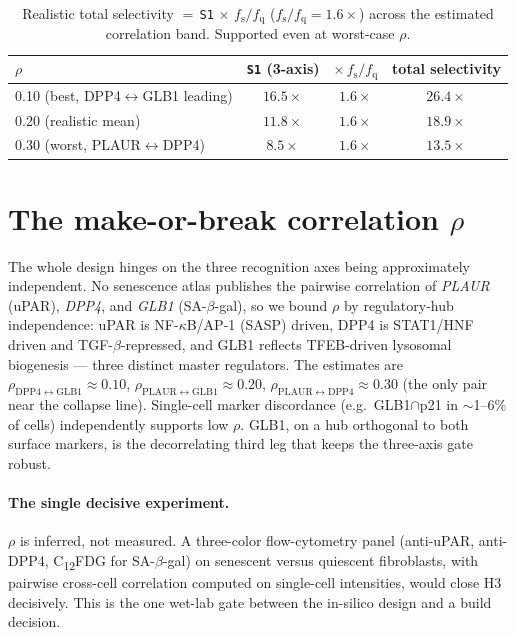 \documentclass[11pt,a4paper]{article}
\newcommand{\fs}{f_{\mathrm{s}}}
\newcommand{\fq}{f_{\mathrm{q}}}
\begin{document}
\begin{table}[h]
\centering
\caption{Realistic total selectivity $=\,$\texttt{S1}$\,\times\,\fs/\fq$
($\fs/\fq=1.6\times$) across the estimated correlation band. Supported even at
worst-case $\rho$.}
\label{tab:total}
\small
\begin{tabular}{@{}lccc@{}}
\toprule
$\rho$ & \texttt{S1} (3-axis) & $\times\,\fs/\fq$ & total selectivity \\
\midrule
0.10 (best, DPP4$\leftrightarrow$GLB1 leading) & $16.5\times$ & $1.6\times$ & $\mathbf{26.4\times}$ \\
0.20 (realistic mean) & $11.8\times$ & $1.6\times$ & $\mathbf{18.9\times}$ \\
0.30 (worst, PLAUR$\leftrightarrow$DPP4) & $8.5\times$ & $1.6\times$ & $\mathbf{13.5\times}$ \\
\bottomrule
\end{tabular}
\end{table}

\section{The make-or-break correlation $\rho$}
\label{sec:rho}

The whole design hinges on the three recognition axes being approximately
independent. No senescence atlas publishes the pairwise correlation of
\textit{PLAUR} (uPAR), \textit{DPP4}, and \textit{GLB1} (SA-$\beta$-gal), so we
bound $\rho$ by regulatory-hub independence: uPAR is NF-$\kappa$B/AP-1 (SASP)
driven, DPP4 is STAT1/HNF driven and TGF-$\beta$-repressed, and GLB1 reflects
TFEB-driven lysosomal biogenesis --- three distinct master regulators. The
estimates are $\rho_{\mathrm{DPP4\leftrightarrow GLB1}}\!\approx\!0.10$,
$\rho_{\mathrm{PLAUR\leftrightarrow GLB1}}\!\approx\!0.20$,
$\rho_{\mathrm{PLAUR\leftrightarrow DPP4}}\!\approx\!0.30$ (the only pair near
the collapse line). Single-cell marker discordance (e.g.\ GLB1$\cap$p21 in
$\sim$1--6\% of cells) independently supports low $\rho$. GLB1, on a hub
orthogonal to both surface markers, is the decorrelating third leg that keeps
the three-axis gate robust.

\paragraph{The single decisive experiment.}
$\rho$ is inferred, not measured. A three-color flow-cytometry panel
(anti-uPAR, anti-DPP4, C\textsubscript{12}FDG for SA-$\beta$-gal) on senescent
versus quiescent fibroblasts, with pairwise cross-cell correlation computed on
single-cell intensities, would close H3 decisively. This is the one wet-lab
gate between the in-silico design and a build decision.
\end{document}
